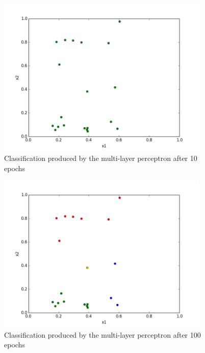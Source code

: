 \documentclass[]{article}
\begin{document}
\begin{figure}[h]
    \centering
    \includegraphics[width=0.9\textwidth]{figures/mlp_classification_10.png}
    \caption{Classification produced by the multi-layer perceptron after 10 epochs}
    \label{fig:mlp_classification_10}
\end{figure}

\begin{figure}[h]
    \centering
    \includegraphics[width=0.9\textwidth]{figures/mlp_classification_100.png}
    \caption{Classification produced by the multi-layer perceptron after 100 epochs}
    \label{fig:mlp_classification_100}
\end{figure}
\end{document}
